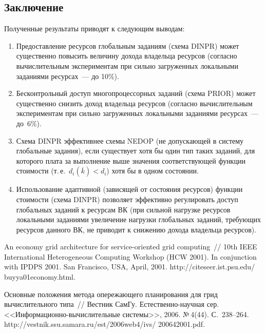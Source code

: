 \begin{multicols}{2}
\section{Заключение}

  Полученные результаты приводят к следующим выводам:
  \begin{enumerate}[1.]
\item Предоставление ресурсов глобальным заданиям (схема DINPR) может
существенно повысить величину дохода владельца ресурсов (согласно
вычислительным экспериментам при сильно загруженных локальными
заданиями ресурсах~--- до 10\%).
\item Бесконтрольный доступ многопроцессорных %
зада\-ний (схема PRIOR)
может существенно снизить доход владельца ресурсов (согласно
вы\-чис\-ли\-тель\-ным экспериментам при сильно загружен\-ных локальными
заданиями ресурсах~--- до~6\%).
\item Схема DINPR эффективнее схемы NEDOP (не допускающей в систему
глобальные задания), если существует хотя бы один тип таких заданий, для
которого плата за выполнение выше значения соответствующей функции
стоимости (т.\,е.\ $d_i (\overline{k}) <d_i$) хотя бы в одном состоянии.
\item Использование адаптивной (зависящей от состояния ресурсов) функции
стоимости (схема DINPR) позволяет эффективно регулировать доступ
глобальных заданий к ресурсам ВК (при сильной нагрузке ресурсов
локальными заданиями увеличение нагрузки глобальных заданий, требующих
ресурсов данного ВК, не приводит к снижению дохода владельца ресурсов).
  \end{enumerate}

{\small\frenchspacing
{%
\begin{thebibliography}{9}

An economy grid architecture for service-oriented grid com\-puting~// 10th IEEE International
Heterogeneous Com\-puting Workshop (HCW 2001). In conjunction with IPDPS 2001. San
Francisco, USA, April, 2001. {\sf http://citeseer.ist.psu.edu/ buyya01economy.html}.

  Основные положения метода опережающего планирования для грид вы\-чис\-ли\-тель\-но\-го
типа~// Вестник СамГу. Ес\-те\-ст\-вен\-но-на\-уч\-ная сер. <<Ин\-фор\-ма\-ци\-он\-но-вы\-чис\-ли\-тель\-ные
системы>>, 2006. №\,4(44). С.~238--264. {\sf
http://vestnik.ssu.samara.ru/est/2006web4/ivs/ 200642001.pdf}.


\end{thebibliography}}}
\end{multicols}

